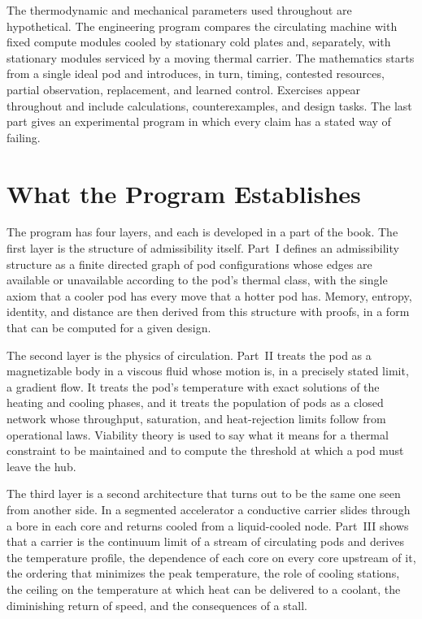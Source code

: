 \documentclass[11pt,openany]{book}
\theoremstyle{plain}
\theoremstyle{definition}
\theoremstyle{remark}
\begin{document}
The thermodynamic and mechanical parameters used throughout are hypothetical. The engineering program compares the circulating machine with fixed compute modules cooled by stationary cold plates and, separately, with stationary modules serviced by a moving thermal carrier. The mathematics starts from a single ideal pod and introduces, in turn, timing, contested resources, partial observation, replacement, and learned control. Exercises appear throughout and include calculations, counterexamples, and design tasks. The last part gives an experimental program in which every claim has a stated way of failing.

\section{What the Program Establishes}

The program has four layers, and each is developed in a part of the book. The first layer is the structure of admissibility itself. Part~I defines an admissibility structure as a finite directed graph of pod configurations whose edges are available or unavailable according to the pod's thermal class, with the single axiom that a cooler pod has every move that a hotter pod has. Memory, entropy, identity, and distance are then derived from this structure with proofs, in a form that can be computed for a given design.

The second layer is the physics of circulation. Part~II treats the pod as a magnetizable body in a viscous fluid whose motion is, in a precisely stated limit, a gradient flow. It treats the pod's temperature with exact solutions of the heating and cooling phases, and it treats the population of pods as a closed network whose throughput, saturation, and heat-rejection limits follow from operational laws. Viability theory is used to say what it means for a thermal constraint to be maintained and to compute the threshold at which a pod must leave the hub.

The third layer is a second architecture that turns out to be the same one seen from another side. In a segmented accelerator a conductive carrier slides through a bore in each core and returns cooled from a liquid-cooled node. Part~III shows that a carrier is the continuum limit of a stream of circulating pods and derives the temperature profile, the dependence of each core on every core upstream of it, the ordering that minimizes the peak temperature, the role of cooling stations, the ceiling on the temperature at which heat can be delivered to a coolant, the diminishing return of speed, and the consequences of a stall.
\end{document}
